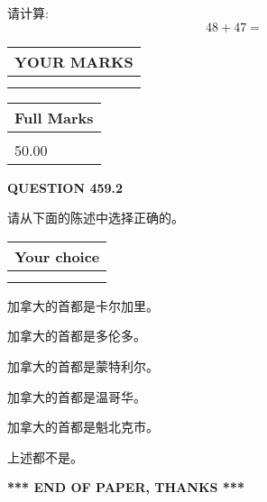 \documentclass{ctexart}
\begin{document}
  
 
请计算:
\begin{equation}
48 +  %
47 = \nonumber
\end{equation}
 

 

 
  
\vspace{0.2in}
  
\noindent\begin{tabular}{|l|}
\hline
 YOUR MARKS  \\
\hline
 \\ 
 \\ 
\hline
\end{tabular}
\hspace{0.05in} \begin{tabular}{|l|}
\hline
 Full Marks  \\
\hline
 \\ 
50.00 \\
\hline
\end{tabular}
{\textbf{\Large{QUESTION
459.2 
}}}
  
  
请从下面的陈述中选择正确的。
  
  
\noindent\hspace{3.0in} \begin{tabular}{|l|}
\hline
Your choice \\
\hline
 \\ 
 \\ 
\hline
\end{tabular}
  
  
 
 
加拿大的首都是卡尔加里。
 
 
加拿大的首都是多伦多。
 
 
加拿大的首都是蒙特利尔。
 
 
加拿大的首都是温哥华。
 
 
加拿大的首都是魁北克市。
 
 
 上述都不是。
 
 
   
   
 \vspace{0.2in}
 
   
   
   
   
\vspace{1.0in} 
{\textbf{\large{ *** END OF PAPER, THANKS *** }}} 
   
\end{document}
